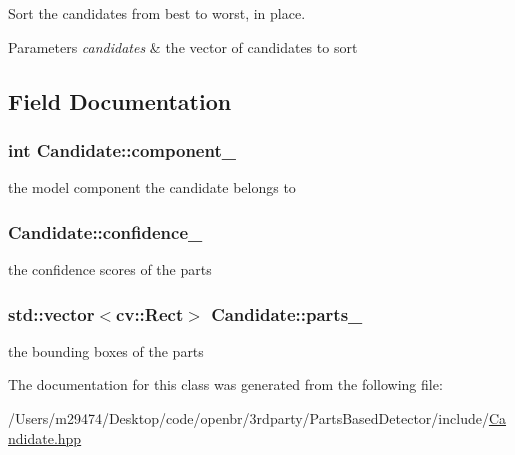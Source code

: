 Sort the candidates from best to worst, in place. 


\begin{DoxyParams}{Parameters}
{\em candidates} & the vector of candidates to sort \\
\hline
\end{DoxyParams}


\subsection{Field Documentation}
\hypertarget{class_candidate_a7866513384d74055891a237a524798ab}{
\subsubsection[{component\-\_\-}]{\setlength{\rightskip}{0pt plus 5cm}int Candidate\-::component\-\_\-\hspace{0.3cm}{\ttfamily [private]}}}\label{class_candidate_a7866513384d74055891a237a524798ab}


the model component the candidate belongs to 

\hypertarget{class_candidate_a31785654c1d01cda9cadf93e919b30f1}{
\subsubsection[{confidence\-\_\-}]{ Candidate\-::confidence\-\_\-\hspace{0.3cm}{\ttfamily [private]}}}\label{class_candidate_a31785654c1d01cda9cadf93e919b30f1}


the confidence scores of the parts 

\hypertarget{class_candidate_aa0e3d40adf86bff2e99f3e4234ce674b}{
\subsubsection[{parts\-\_\-}]{\setlength{\rightskip}{0pt plus 5cm}std\-::vector$<$cv\-::\-Rect$>$ Candidate\-::parts\-\_\-\hspace{0.3cm}{\ttfamily [private]}}}\label{class_candidate_aa0e3d40adf86bff2e99f3e4234ce674b}


the bounding boxes of the parts 



The documentation for this class was generated from the following file\-:\begin{DoxyCompactItemize}
\item 
/\-Users/m29474/\-Desktop/code/openbr/3rdparty/\-Parts\-Based\-Detector/include/\hyperlink{_candidate_8hpp}{Candidate.\-hpp}\end{DoxyCompactItemize}
